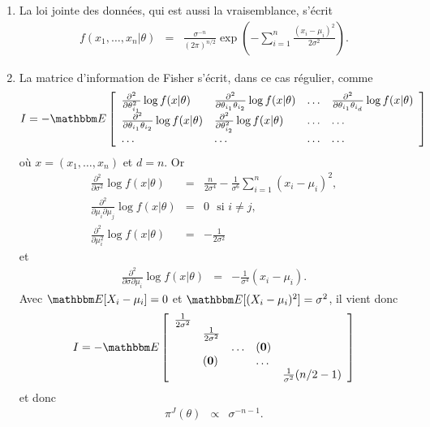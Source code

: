 \begin{enumerate}
\item La loi jointe des données, qui est aussi la vraisemblance, s'écrit 
\begin{eqnarray}
f(x_1,\ldots,x_n| \theta) & = & \frac{\sigma^{-n}}{(2\pi)^{n/2}} \exp\left(-\sum\limits_{i=1}^n \frac{(x_i-\mu_i)^2}{2\sigma^2}\right). \label{vrais}
\end{eqnarray}
\item La matrice d'information de Fisher s'écrit, dans ce cas régulier, comme 
$$
I=-\E\left[\begin{array}{llll}
\frac{\partial^2}{\partial \theta^2_{i_1}} \log f(x | \theta) & \frac{\partial^2}{\partial \theta_{i_1}\theta_{i_2}} \log f(x | \theta) & \ldots & \frac{\partial^2}{\partial \theta_{i_1}\theta_{i_d}} \log f(x | \theta) \\
\frac{\partial^2}{\partial \theta_{i_1}\theta_{i_2}} \log f(x | \theta) & \frac{\partial^2}{\partial \theta^2_{i_2}} \log f(x | \theta) & \ldots & \ldots \\
\ldots & \ldots & \ldots & \ldots 
\end{array}\right]
$$
où $x=(x_1,\ldots,x_n)$ et $d=n$. Or
\begin{eqnarray*}
\frac{\partial^2}{\partial \sigma^2} \log f(x | \theta) & = & \frac{n}{2\sigma^4} - \frac{1}{\sigma^6}\sum\limits_{i=1}^n (x_i-\mu_i)^2, \\
\frac{\partial^2}{\partial \mu_i \partial \mu_j} \log f(x | \theta) & = & 0 \ \ \ \text{si $i\neq j$,} \\
\frac{\partial^2}{\partial \mu^2_i} \log f(x | \theta) & = & -\frac{1}{2\sigma^2}
\end{eqnarray*}
et
\begin{eqnarray*}
\frac{\partial^2}{\partial \sigma \partial \mu_i }\log f(x | \theta) & = & -\frac{1}{\sigma^4} (x_i-\mu_i).
\end{eqnarray*}
Avec $\E[X_i-\mu_i]=0$ et $\E[(X_i-\mu_i)^2]=\sigma^2$, il vient donc
$$
I=-\E\left[\begin{array}{lllll}
\frac{1}{2\sigma^2} & \\
&  \frac{1}{2\sigma^2}  & \\
&&  \ldots & {\bf (0)} \\
& {\bf (0)} && \ldots & \\
&&&& \frac{1}{\sigma^2} (n/2-1)
\end{array}\right]
$$
et donc
\begin{eqnarray*}
\pi^J(\theta) & \propto & \sigma^{-n-1}.
\end{eqnarray*}

\end{enumerate}
